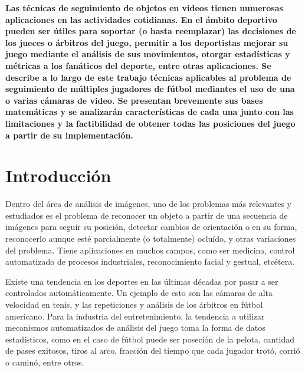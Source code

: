 \documentclass[a4paper,10pt]{article}
\title{}
\date{20 de Septiembre de 2013}
\author{Civile, Juan Pablo \and Crespo, Álvaro \and Ordano, Esteban }
\begin{document}
\pagestyle{fancy}
\maketitle
\thispagestyle{fancy}

\begin{customabstract}
\textbf{
Las técnicas de seguimiento de objetos en videos tienen numerosas aplicaciones
en las actividades cotidianas. En el ámbito deportivo pueden ser útiles para
soportar (o hasta reemplazar) las decisiones de los jueces o árbitros del
juego, permitir a los deportistas mejorar su juego mediante el análisis de sus
movimientos, otorgar estadísticas y métricas a los fanáticos del deporte, entre
otras aplicaciones. Se describe a lo largo de este trabajo técnicas
aplicables al problema de seguimiento de múltiples jugadores de fútbol
mediantes el uso de una o varias cámaras de video. Se presentan brevemente sus
bases matemáticas y se analizarán características de cada una junto con las
limitaciones y la factibilidad de obtener todas las posiciones del juego a
partir de su implementación.
} \end{customabstract}

\newpage

\part*{Introducción}

Dentro del área de análisis de imágenes, uno de los problemas más relevantes y
estudiados es el problema de reconocer un objeto a partir de una secuencia de
imágenes para seguir su posición, detectar cambios de orientación o en su
forma, reconocerlo aunque esté parcialmente (o totalmente) ocluído, y otras 
variaciones del problema. Tiene aplicaciones en muchos campos, como ser
medicina, control automatizado de procesos industriales, reconocimiento facial
y gestual, etcétera.

Existe una tendencia en los deportes en las últimas décadas por pasar a ser
controlados automáticamente. Un ejemplo de esto son las cámaras de alta
velocidad en tenis, y las repeticiones y análisis de los árbitros en fútbol
americano. Para la industria del entretenimiento, la tendencia a utilizar
mecanismos automatizados de análisis del juego toma la forma de datos
estadísticos, como en el caso de fútbol puede ser poseción de la pelota,
cantidad de pases exitosos, tiros al arco, fracción del tiempo que cada jugador
trotó, corrió o caminó, entre otros.
\end{document}
